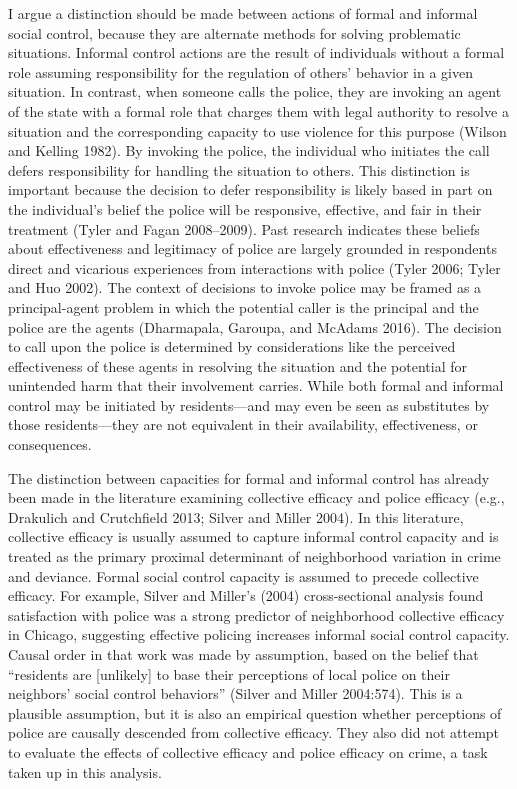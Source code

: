 \documentclass [11pt, proquest] {uwthesis}[2015/03/03]
\begin{document}
I argue a distinction should be made between actions of formal and informal social control, because they are alternate methods for solving problematic situations. Informal control actions are the result of individuals without a formal role assuming responsibility for the regulation of others' behavior in a given situation. In contrast, when someone calls the police, they are invoking an agent of the state with a formal role that charges them with legal authority to resolve a situation and the corresponding capacity to use violence for this purpose (Wilson and Kelling 1982). By invoking the police, the individual who initiates the call defers responsibility for handling the situation to others. This distinction is important because the decision to defer responsibility is likely based in part on the individual's belief the police will be responsive, effective, and fair in their treatment (Tyler and Fagan 2008--2009). Past research indicates these beliefs about effectiveness and legitimacy of police are largely grounded in respondents direct and vicarious experiences from interactions with police (Tyler 2006; Tyler and Huo 2002). The context of decisions to invoke police may be framed as a principal-agent problem in which the potential caller is the principal and the police are the agents (Dharmapala, Garoupa, and McAdams 2016). The decision to call upon the police is determined by considerations like the perceived effectiveness of these agents in resolving the situation and the potential for unintended harm that their involvement carries. While both formal and informal control may be initiated by residents---and may even be seen as substitutes by those residents---they are not equivalent in their availability, effectiveness, or consequences.

The distinction between capacities for formal and informal control has already been made in the literature examining collective efficacy and police efficacy (e.g., Drakulich and Crutchfield 2013; Silver and Miller 2004). In this literature, collective efficacy is usually assumed to capture informal control capacity and is treated as the primary proximal determinant of neighborhood variation in crime and deviance. Formal social control capacity is assumed to precede collective efficacy. For example, Silver and Miller's (2004) cross-sectional analysis found satisfaction with police was a strong predictor of neighborhood collective efficacy in Chicago, suggesting effective policing increases informal social control capacity. Causal order in that work was made by assumption, based on the belief that ``residents are {[}unlikely{]} to base their perceptions of local police on their neighbors' social control behaviors'' (Silver and Miller 2004:574). This is a plausible assumption, but it is also an empirical question whether perceptions of police are causally descended from collective efficacy. They also did not attempt to evaluate the effects of collective efficacy and police efficacy on crime, a task taken up in this analysis.
\end{document}
